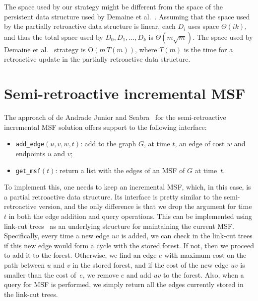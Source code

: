 \documentclass[reqno,11pt]{amsart}
\newcommand{\Oh}{\mathrm{O}}
\begin{document}


\medskip 

The space used by our strategy might be different from the space of 
the persistent data structure used by Demaine et al.~\cite{DemaineIL2007}. 
Assuming that the space used by the partially retroactive 
data structure is linear, each $D_i$ uses space $\Theta(ik)$, 
and thus the total space used by $D_0,D_1,\ldots,D_k$ is $\Theta(m\sqrt{m})$. 
The space used by Demaine et al.~\cite{DemaineIL2007} strategy is $\Oh(m\,T(m))$, 
where $T(m)$ is the time for a retroactive update in the partially retroactive data structure. 

\section{Semi-retroactive incremental MSF}\label{sec:incMSF}

The approach of de Andrade Junior and Seabra~\cite{deAndradeJrS2022} for the 
semi-retroactive incremental MSF solution offers support to the following interface:
\begin{itemize}
\item \texttt{add\_edge}$(u,v,w,t)$: add to the graph $G$, at time $t$,
  an edge of cost $w$ and endpoints $u$ and $v$;
\item \texttt{get\_msf}$(t)$: return a list with the edges of an MSF of $G$ at
  time~$t$.
\end{itemize}

To implement this, one needs to keep an incremental MSF, which, in
this case, is a partial retroactive data structure. Its interface is
pretty similar to the semi-retroactive version, and the only difference
is that we drop the argument for time $t$ in both the edge addition and 
query operations. This can be implemented using link-cut trees~\cite{SleatorT1981} 
as an underlying structure for maintaining the current MSF. Specifically, 
every time a new edge $uv$ is added, we can check in the link-cut trees if 
this new edge would form a cycle with the stored forest. If not, then we 
proceed to add it to the forest.  
Otherwise, we find an edge $e$ with maximum cost on the path between $u$ 
and $v$ in the stored forest, and if the cost of the new edge $uv$ is smaller 
than the cost of~$e$, we remove $e$ and add $uv$ to the forest.
Also, when a query for MSF is performed, 
we simply return all the edges currently stored in the link-cut trees.
\end{document}
